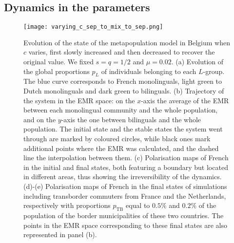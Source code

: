 \documentclass[../thesis.tex]{subfiles}
\begin{document}
\subsection{Dynamics in the parameters}
\begin{figure}
\centering
    \texttt{[image: varying\_c\_sep\_to\_mix\_to\_sep.png]}
    \caption{Evolution of the state of the metapopulation model in Belgium when $c$
    varies, first slowly increased and then decreased to recover the original value. We
    fixed $s=q=1/2$ and $\mu=0.02$. (a) Evolution of the global proportions $p_L$ of
    individuals belonging to each $L$-group. The blue curve corresponds to French
    monolinguals, light green to Dutch monolinguals and dark green to bilinguals. (b)
    Trajectory of the system in the \ac{EMR} space: on the $x$-axis the average of the
    \ac{EMR} between each monolingual community and the whole population, and on the
    $y$-axis the one between bilinguals and the whole population. The initial state and
    the stable states the system went through are marked by coloured circles, while
    black ones mark additional points where the \ac{EMR} was calculated, and the dashed
    line the interpolation between them. (c) Polarisation maps of French in the initial
    and final states, both featuring a boundary but located in different areas, thus
    showing the irreversibility of the dynamics. (d)-(e) Polarisation maps of French in
    the final states of simulations including transborder commuters from France and the
    Netherlands, respectively with proportions $p_{\text{TB}}$ equal to $0.5\%$ and
    $0.2\%$ of the population of the border municipalities of these two countries. The
    points in the \ac{EMR} space corresponding to these final states are also
    represented in panel (b).}
    \label{fig:varying_c_sep_to_mix_to_sep}
\end{figure}
    
\end{document}
